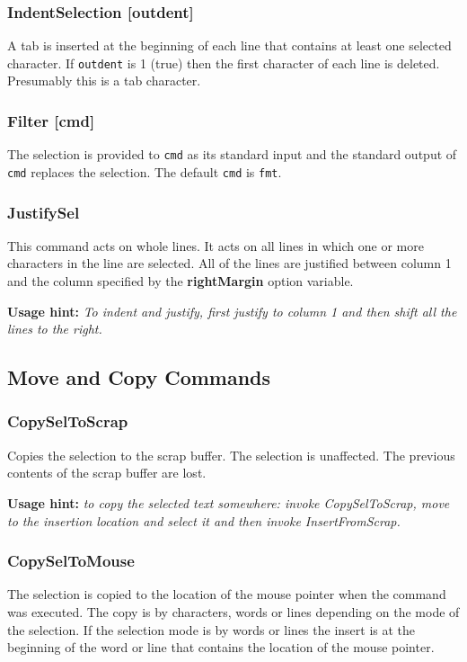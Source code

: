 \subsubsection{IndentSelection [outdent]}
A tab is inserted at the beginning of each line that contains
at least one selected character.
If {\tt outdent} is 1 (true) then the first character
of each line is deleted.
Presumably this is a tab character.

\subsubsection{Filter [cmd]}
The selection is provided to {\tt cmd} as its standard
input and the standard output of {\tt cmd} replaces
the selection.
The default {\tt cmd} is {\tt fmt}.

\subsubsection{JustifySel}
This command acts on whole lines.
It acts on all lines in which one or more characters
in the line are selected.
All of the lines are justified between column 1 and the column
specified by the {\bf rightMargin} option variable.

{\bf Usage hint:} {\it To indent and justify, first justify to column 1 and
then shift all the lines to the right.}




\subsection{Move and Copy Commands}

\subsubsection{CopySelToScrap}
Copies the selection to the scrap buffer.
The selection is unaffected.
The previous contents of the scrap buffer are lost.

{\bf Usage hint:} {\it to copy the selected text somewhere:
invoke CopySelToScrap, move to the insertion location and
select it and then invoke InsertFromScrap.}

\subsubsection{CopySelToMouse}
The selection is copied to the location of the mouse pointer
when the command was executed.
The copy is by characters, words or lines depending on the mode
of the selection.
If the selection mode is by words or lines the insert is at the
beginning of the word or line that contains the location
of the mouse pointer.

